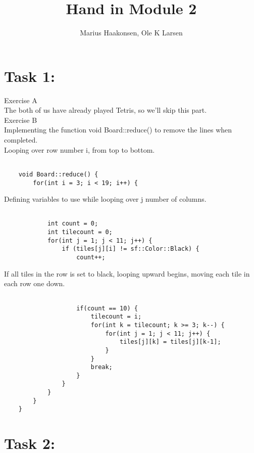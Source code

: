 \documentclass[11pt]{amsart}
\title{Hand in Module 2}
\author{Marius Haakonsen, Ole K Larsen}
\begin{document}
\maketitle

\section{Task 1:}

Exercise A  \\
The both of us have already played Tetris, so we'll skip this part.  \\

Exercise B \\

Implementing the function void Board::reduce() to remove the lines when completed. \\

Looping over row number i, from top to bottom. \\
\begin{verbatim}

	void Board::reduce() {
	    for(int i = 3; i < 19; i++) {

\end{verbatim}

Defining variables to use while looping over j number of columns. \\
\begin{verbatim}

	        int count = 0;
	        int tilecount = 0;
	        for(int j = 1; j < 11; j++) {
	            if (tiles[j][i] != sf::Color::Black) {
	                count++;

\end{verbatim}

If all tiles in the row is set to black, looping upward begins, moving each tile
in each row one down. \\
\begin{verbatim}

	                if(count == 10) {
	                    tilecount = i;
	                    for(int k = tilecount; k >= 3; k--) {
	                        for(int j = 1; j < 11; j++) {
	                            tiles[j][k] = tiles[j][k-1];
	                        }
	                    }
	                    break;
	                }
	            }
	        }
	    }
	}

\end{verbatim}


\section{Task 2:}
\end{document}
